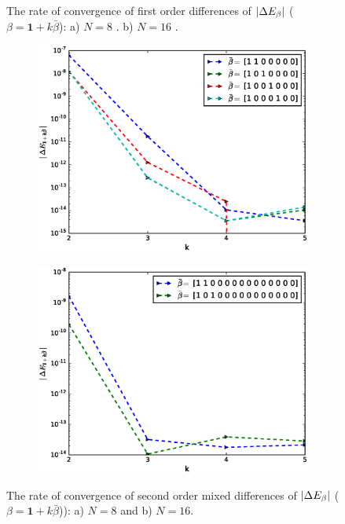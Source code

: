 \documentclass[11pt]{article}
\begin{document}
\begin{figure}[!h]
\begin{subfigure}{.5\textwidth}
		\caption{}
		\label{fig:sub42}
	\end{subfigure}%
	\caption{The rate of convergence of first order differences of $\left\lvert\Delta E_{\beta}\right\rvert$ ($\beta=\mathbf{1}+k \bar{\beta}$): a) $N=8$ . b) $N=16$ .}
	\label{fig:test4}
\end{figure}

\begin{figure}[!h]
	\centering
	\begin{subfigure}{.5\textwidth}
		\centering
		\includegraphics[width=1\linewidth]{./figures/mixed_difference_order2_1D_BS_N_8.eps}
		\caption{}
		\label{fig:sub51}
	\end{subfigure}%
	\begin{subfigure}{.5\textwidth}
		\centering
		\includegraphics[width=1\linewidth]{./figures/mixed_difference_order2_1D_BS_N_16.eps}
		\caption{}
		\label{fig:sub52}
	\end{subfigure}
	
	\caption{The rate of convergence of second order mixed differences of  $\left\lvert\Delta E_{\beta}\right\rvert$ ($\beta=\mathbf{1}+k \bar{\beta}$)): a) $N=8$ and b) $N=16$.}
	\label{fig:test5}
\end{figure}
\end{document}
